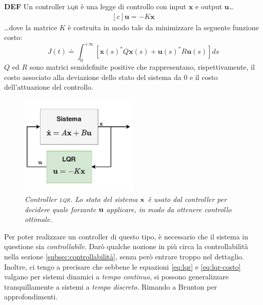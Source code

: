 \begin{framed}
  \textbf{DEF}
  Un controller \textsc{lqr} è una legge di controllo con input $\mathbf x$ e output $\mathbf u$\ldots
  \begin{equation}
    \begin{aligned}[c]
      \mathbf u = -K \mathbf x
    \end{aligned}
    \label{eq:lqr}
  \end{equation}
  \ldots dove la matrice $K$ è costruita in modo tale da minimizzare la seguente funzione costo:
  \begin{equation}
    J(t) \doteq
      \int_0^{+\infty} \left[ \mathbf{x} (s)^* Q \mathbf {x} (s) + \mathbf {u} (s)^* R \mathbf {u} (s) \right] ds
    \label{eq:lqr-costo}
  \end{equation}
  $Q$ ed $R$ sono matrici semidefinite positive che rappresentano, rispettivamente, il costo associato alla
  deviazione dello stato del sistema da $0$ e il costo dell'attuazione del controllo.
\end{framed}

\begin{figure}[h]
  \includegraphics[width=0.5\textwidth]{../assets/diagramma lqr.pdf}
  \caption{\emph{Controller \textsc{lqr}. Lo stato del sistema $\bf x$ è usato dal controller per decidere quale forzante
  $\bf u$ applicare, in modo da ottenere controllo ottimale.}}
  \label{fig:lqr}
\end{figure}

Per poter realizzare un controller di questo tipo, è necessario che il sistema in questione sia \emph{controllabile}.
Darò qualche nozione in più circa la controllabilità nella sezione \ref{subsec:controllabilità}, senza però entrare
troppo nel dettaglio.
Inoltre, ci tengo a precisare che sebbene le equazioni \eqref{eq:lqr} e \eqref{eq:lqr-costo}
valgano per sistemi dinamici a \emph{tempo continuo}, si possono generalizzare tranquillamente a sistemi
a \emph{tempo discreto}.
Rimando a Brunton\cite{brunton2019data} per approfondimenti.

